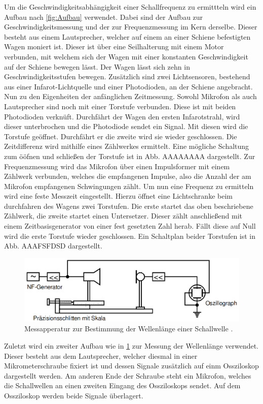 Um die Geschwindigkeitsabhängigkeit einer Schallfrequenz zu ermittteln wird ein Aufbau nach \ref{fig:Aufbau}
 verwendet. Dabei sind der Aufbau zur Geschwindigkeitsmessung und der zur
  Frequenzmessung im Kern derselbe. Dieser besteht aus einem Lautsprecher, welcher
   auf einem an einer Schiene befestigten Wagen moniert ist.
 Dieser ist über eine Seilhalterung mit einem Motor verbunden, mit welchem sich
  der Wagen mit einer konstanten Geschwindigkeit auf der Schiene bewegen lässt.
   Der Wagen lässt sich zehn in Geschwindigkeitsstufen bewegen.
Zusätzlich sind zwei Lichtsensoren, bestehend aus einer Infarot-Lichtquelle und
 einer Photodioden, an der Schiene angebracht.
 Nun zu den Eigenheiten der anfänglichen Zeitmessung. Sowohl Mikrofon als auch
  Lautsprecher sind noch mit einer Torstufe verbunden. Diese ist mit beiden Photodioden verknüft.
    Durchfährt der Wagen
 den ersten Infarotstrahl, wird dieser unterbrochen und die Photodiode sendet ein Signal.
 Mit diesen wird die Torstufe geöffnet. Durchfährt er die zweite wird sie wieder
  geschlossen. Die Zeitdifferenz wird mithilfe eines Zählwerkes ermittelt.
    Eine mögliche Schaltung zum ööfnen und schließen
  der Torstufe ist in Abb. AAAAAAAA dargestellt.
  Zur Frequenzmessung wird das Mikrofon über einen Impulsformer mit einem Zählwerk
   verbunden, welches die empfangenen Impulse, also die Anzahl der am Mikrofon empfangenen Schwingungen zählt.
   Um nun eine Frequenz zu ermitteln wird eine feste Messzeit eingestellt. Hierzu öffnet
   eine Lichtschranke beim durchfahren des Wagens zwei Torstufen. Die erste
    startet das oben beschriebene Zählwerk, die zweite startet einen Untersetzer.
     Dieser zählt anschließend mit einem Zeitbasisgenerator von einer fest gesetzten Zahl herab.
      Fällt diese auf Null wird die erste Torstufe wieder geschlossen. Ein Schaltplan
       beider Torstufen ist in Abb. AAAFSFDSD dargestellt.
       \begin{figure}[H]
                \centering
                \includegraphics[width=\linewidth-50pt,height=\textheight-50pt,keepaspectratio]{content/Bilder/Lambda.png}
                \caption{Messapperatur zur Bestimmung der Wellenlänge einer Schallwelle \cite{V104}.}
                \label{fig:lamb}
              \end{figure}

       Zuletzt wird ein zweiter Aufbau wie in \ref{fig:lamb} zur Messung der Wellenlänge verwendet.
       Dieser besteht aus dem Lautsprecher, welcher diesmal in einer Mikrometerschraube fixiert
        ist und dessen Signale zusätzlich auf einm Ossziloskop dargestellt werden.
        Am anderen Ende der Schraube steht ein Mikrofon, welches die Schallwellen an einen zweiten Eingang
         des Ossziloskops sendet. Auf dem Ossziloskop werden beide Signale überlagert.
